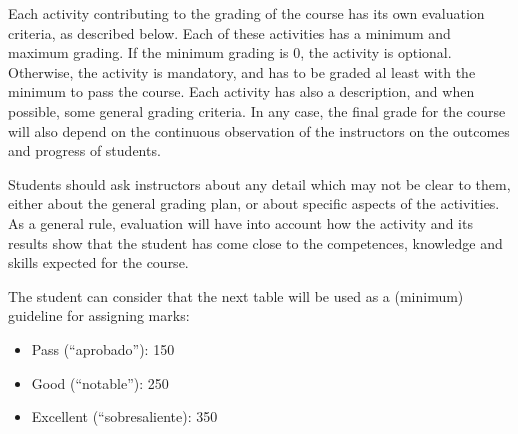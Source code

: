 \documentclass[a4paper]{article}
\begin{document}
Each activity contributing to the grading of the course has its own evaluation criteria, as described below. Each of these activities has a minimum and maximum grading. If the minimum grading is 0, the activity is optional. Otherwise, the activity is mandatory, and has to be graded al least with the minimum to pass the course. Each activity has also a description, and when possible, some general grading criteria. In any case, the final grade for the course will also depend on the continuous observation of the instructors on the outcomes and progress of students.

Students should ask instructors about any detail which may not be clear to them, either about the general grading plan, or about specific aspects of the activities. As a general rule, evaluation will have into account how the activity and its results show that the student has come close to the competences, knowledge and skills expected for the course.

The student can consider that the next table will be used as a (minimum) guideline for assigning marks:

\begin{itemize}
\item Pass (``aprobado''): 150
\item Good (``notable''): 250
\item Excellent (``sobresaliente): 350
\end{itemize}
\end{document}
